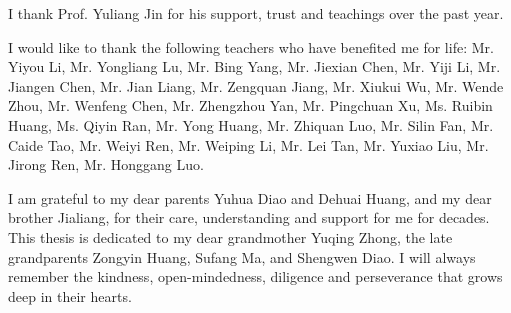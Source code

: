 \documentclass[
11pt, %
ngerman,
english, %
singlespacing, %
headsepline, %
]{MastersDoctoralThesis} %
\begin{document}
\begin{acknowledgements}
%
I thank Prof. Yuliang Jin for his support, trust and teachings over the past year.

%
I would like to thank the following teachers who have benefited me for life:
Mr. Yiyou Li, Mr. Yongliang Lu,  
Mr. Bing Yang, Mr. Jiexian Chen, Mr. Yiji Li, Mr. Jiangen Chen, Mr. Jian Liang, Mr. Zengquan Jiang, 
Mr. Xiukui Wu, Mr. Wende Zhou, Mr. Wenfeng Chen, 
Mr. Zhengzhou Yan, Mr. Pingchuan Xu, Ms. Ruibin Huang, Ms. Qiyin Ran, Mr. Yong Huang, Mr. Zhiquan Luo, Mr. Silin Fan, Mr. Caide Tao, Mr. Weiyi Ren, Mr. Weiping Li,
Mr. Lei Tan, Mr. Yuxiao Liu, Mr. Jirong Ren, Mr. Honggang Luo.

%
I am grateful to my dear parents Yuhua Diao and Dehuai Huang, and my dear brother Jialiang, for their care, 
understanding and support for me for decades. 
This thesis is dedicated to my dear grandmother Yuqing Zhong, the late grandparents Zongyin Huang, Sufang Ma, and Shengwen Diao. 
I will always remember the kindness, open-mindedness, diligence and perseverance that grows deep in their hearts.

\end{acknowledgements}

{
\hypersetup{linkcolor=black}
\tableofcontents %
}

{
\hypersetup{linkcolor=black}
\listoffigures %
}

{
\hypersetup{linkcolor=black}
\listoftables %
}

\end{document}
